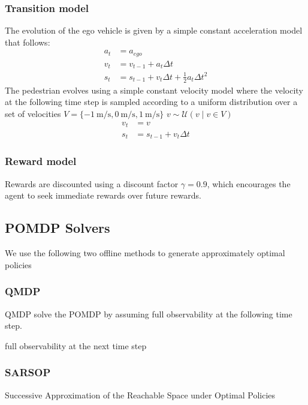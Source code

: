 \documentclass[conference]{IEEEtran}
\begin{document}
\subsubsection{Transition model} The evolution of the ego vehicle is given by a simple constant acceleration model that follows:
\begin{align}
    a_t &= a_{ego} \nonumber \\
    v_t &= v_{t-1} + a_t \Delta t \\
    s_t &= s_{t-1} + v_t \Delta t + \tfrac{1}{2} a_t \Delta t^2 \nonumber
\end{align}
The pedestrian evolves using a simple constant velocity model where the velocity at the following time step is sampled according to a uniform distribution over a set of velocities $V = \{-1~\si{\meter\per\second}, 0~\si{\meter\per\second}, 1~\si{\meter\per\second}\}$ $v \sim \mathcal{U}(v \mid v \in V)$
\begin{align}
    v_t &= v \nonumber \\
    s_t &= s_{t-1} + v_t \Delta t 
\end{align}

\subsubsection{Reward model} Rewards are discounted using a discount factor $\gamma = 0.9$, which encourages the agent to seek immediate rewards over future rewards.  



\subsection{POMDP Solvers}

We use the following two offline methods to generate approximately optimal policies

\subsubsection{QMDP}
QMDP solve the POMDP by assuming full observability at the following time step. \cite{Littman1995LearningUp}

full observability at the next time step

\subsubsection{SARSOP}
Successive Approximation of the Reachable Space under Optimal Policies 
\cite{Kurniawati2009SARSOP:Spaces}
\end{document}
